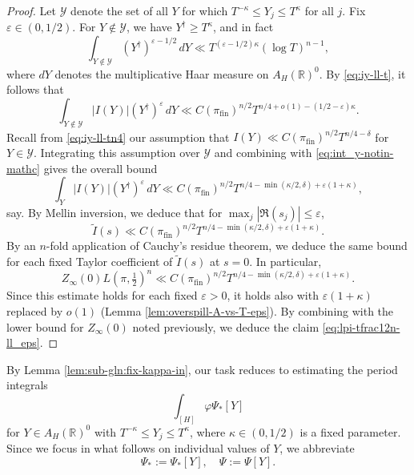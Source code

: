 \documentclass[reqno]{amsart}
\def\eps{\varepsilon}
\DeclareMathOperator{\fin}{fin}
\theoremstyle{plain} \newtheorem{theorem} {Theorem}
\theoremstyle{definition} \newtheorem{definition} [theorem] {Definition}
\theoremstyle{itplain} %
\numberwithin{equation}{section}
\numberwithin{theorem}{section}
\renewcommand{\geq}{\geqslant}
\renewcommand{\leq}{\leqslant}
\begin{document}
\begin{proof}
  Let $\mathcal{Y}$ denote the set of all $Y$ for which $T^{-\kappa} \leq Y_j \leq T^{\kappa}$ for all $j$.  Fix $\eps \in (0,1/2)$.   For $Y \notin \mathcal{Y}$, we have $Y ^\dagger \geq T^{\kappa}$, and in fact
  \begin{equation*}
    \int _{Y \notin \mathcal{Y} } (Y ^\dagger)^{\eps - 1/2} \, d Y \ll T^{(\eps - 1/2) \kappa} (\log T)^{n-1},
  \end{equation*}
  where $d Y$ denotes the multiplicative Haar measure on $A_H(\mathbb{R})^0$.  By \eqref{eq:iy-ll-t}, it follows that
  \begin{equation}\label{eq:int_y-notin-mathc}
    \int_{Y \notin \mathcal{Y} }
    |I(Y)| (Y ^\dagger )^{\eps} \, d Y
    \ll 
    C(\pi_{\fin})^{n/2}
    T^{n/4  + o(1) - (1/2-\eps) \kappa}.
  \end{equation}
Recall from \eqref{eq:iy-ll-tn4} our assumption that $I(Y) \ll C(\pi_{\fin})^{n/2} T^{n/4 - \delta}$ for $Y \in \mathcal{Y}$.  Integrating this assumption over $\mathcal{Y}$ and combining with \eqref{eq:int_y-notin-mathc} gives the overall bound
  \begin{equation}
    \int_{Y} |I(Y)| (Y ^\dagger )^\eps  \, d Y
    \ll
    C(\pi_{\fin})^{n/2}
    T^{n/4  - \min(\kappa/2,\delta)  + \eps (1 + \kappa) },
  \end{equation}
  say.  By Mellin inversion, we deduce that
  for
  $\max_j
   |\Re(s_j)| \leq \eps$,
  \begin{equation*}
    \tilde{I}(s)
    \ll
    C(\pi_{\fin})^{n/2}
    T^{n/4  - \min(\kappa/2,\delta)  + \eps (1 + \kappa) }.
  \end{equation*}
  By an $n$-fold application of Cauchy's residue theorem, we deduce the same bound for each fixed Taylor coefficient of $\tilde{I}(s)$ at $s=0$.  In particular,
  \begin{equation}
    Z_\infty(0)
    L(\pi,\tfrac{1}{2})^n \ll
    C(\pi_{\fin})^{n/2}
    T^{n/4  - \min(\kappa/2,\delta) + \eps (1 + \kappa) }.
  \end{equation}
  Since this estimate holds for each fixed $\eps > 0$, it holds also with $\eps (1 + \kappa)$ replaced by $o(1)$ (Lemma \ref{lem:overspill-A-vs-T-eps}).  By combining with the lower bound for $Z_\infty(0)$ noted previously, we deduce the claim \eqref{eq:lpi-tfrac12n-ll_eps}.
\end{proof}


By Lemma \ref{lem:sub-gln:fix-kappa-in}, our task reduces to estimating the period integrals
\begin{equation*}
  \int _{[H]} \varphi \Psi_{\ast}[Y]
\end{equation*}
for $Y \in A_H(\mathbb{R})^0$ with $T^{-\kappa} \leq Y_j \leq T^\kappa$, where $\kappa \in (0,1/2)$ is a fixed parameter.  Since we focus in what follows on individual values of $Y$, we abbreviate 
\begin{equation*}
  \Psi_{\ast} := \Psi_{\ast}[Y],
  \quad
  \Psi := \Psi[Y].
\end{equation*}
\end{document}
